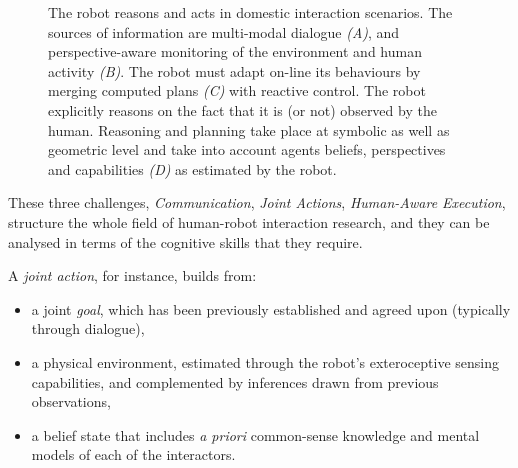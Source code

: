 \documentclass[preprint,3p,times]{elsarticle}
\begin{document}
\begin{figure}[htb]
\centering
{}

\caption{The robot reasons and acts in domestic interaction scenarios.  The
    sources of information are multi-modal dialogue {\it (A)}, and
    perspective-aware monitoring of the environment and human activity {\it
    (B)}. The robot must adapt on-line its behaviours by merging computed plans
    {\it (C)} with reactive control. The robot explicitly reasons on the fact
    that it is (or not) observed by the human. Reasoning and planning take place
    at symbolic as well as geometric level and take into account agents beliefs,
    perspectives and capabilities {\it (D)} as estimated by the robot.}

\label{fig:hri-dec}
\end{figure}

These three challenges, \emph{Communication}, \emph{Joint Actions},
\emph{Human-Aware Execution}, structure the whole field of human-robot
interaction research, and they can be analysed in terms of the cognitive skills
that they require.

A \emph{joint action}, for instance, builds from:

\begin {itemize}
    \item a joint \emph{goal}, which has been previously established and agreed
        upon (typically through dialogue),
    
    \item a physical environment, estimated through the robot's exteroceptive
        sensing capabilities, and complemented by inferences drawn from previous
        observations,
    
    \item a belief state that includes {\it a priori} common-sense knowledge and
        mental models of each of the interactors.

\end {itemize}
\end{document}
